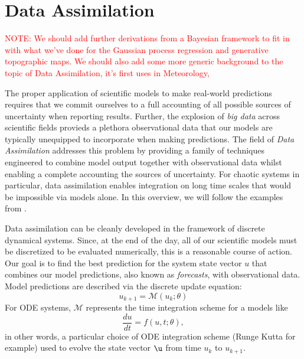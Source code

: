 
\section{Data Assimilation}

\textcolor{red}{NOTE: We should add further derivations from a Bayesian framework to fit in with what we've done for the Gaussian process regression and generative topographic maps. We should also add some more generic background to the topic of Data Assimilation, it's first uses in Meteorology, }


The proper application of scientific models to make real-world predictions requires that we commit ourselves to a full accounting of all possible sources of uncertainty when reporting results. Further, the explosion of \textit{big data} across scientific fields provieds a plethora observational data that our models are typically unequipped to incorporate when making predictions. The field of \textit{Data Assimilation} addresses this problem by providing a family of techniques engineered to combine model output together with observational data whilst enabling a complete accounting the sources of uncertainty. For chaotic systems in particular, data assimilation enables integration on long time scales that would be impossible via models alone. In this overview, we will follow the examples from \cite{pyda}.

Data assimilation can be cleanly developed in the framework of discrete dynamical systems. Since, at the end of the day, all of our scientific models must be discretized to be evaluated numerically, this is a reasonable course of action. Our goal is to find the best prediction for the system state vector $u$ that combines our model predictions, also known as \textit{forecasts}, with observational data. Model predictions are described via the discrete update equation:
\begin{equation}
    u_{k+1} = \mathcal{M}(u_k; \theta)
\end{equation}
For ODE systems, $\mathcal{M}$ represents the time integration scheme for a models like
\begin{equation}
    \dfrac{du}{dt} = f(u, t; \theta),
\end{equation}
in other words, a particular choice of ODE integration scheme (Runge Kutta for example) used to evolve the state vector $\u$ from time $u_k$ to $u_{k+1}$.

